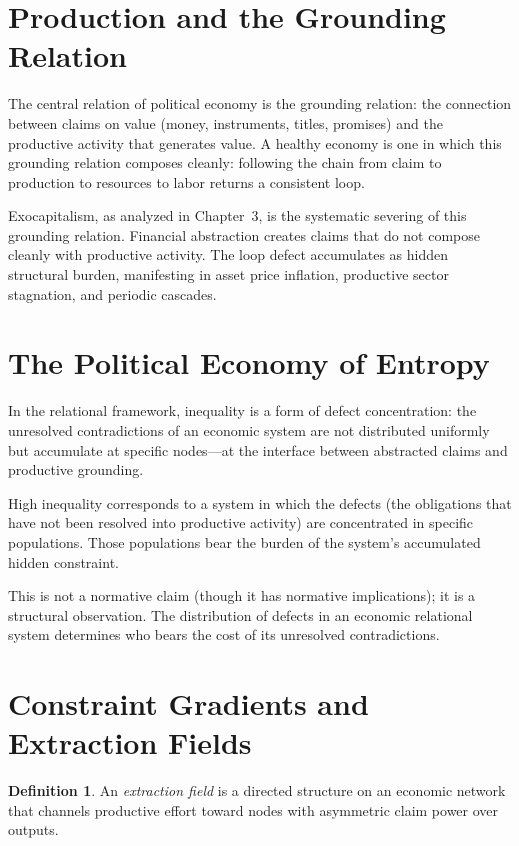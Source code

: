 \documentclass[12pt,a4paper,openany]{book}
\theoremstyle{plain}
\theoremstyle{definition}
\newtheorem{definition}[theorem]{Definition}
\theoremstyle{remark}
\begin{document}
\section{Production and the Grounding Relation}

The central relation of political economy is the grounding relation: the connection between claims on value (money, instruments, titles, promises) and the productive activity that generates value. A healthy economy is one in which this grounding relation composes cleanly: following the chain from claim to production to resources to labor returns a consistent loop.

Exocapitalism, as analyzed in Chapter~3, is the systematic severing of this grounding relation. Financial abstraction creates claims that do not compose cleanly with productive activity. The loop defect accumulates as hidden structural burden, manifesting in asset price inflation, productive sector stagnation, and periodic cascades.

\section{The Political Economy of Entropy}

In the relational framework, inequality is a form of defect concentration: the unresolved contradictions of an economic system are not distributed uniformly but accumulate at specific nodes---at the interface between abstracted claims and productive grounding.

High inequality corresponds to a system in which the defects (the obligations that have not been resolved into productive activity) are concentrated in specific populations. Those populations bear the burden of the system's accumulated hidden constraint.

This is not a normative claim (though it has normative implications); it is a structural observation. The distribution of defects in an economic relational system determines who bears the cost of its unresolved contradictions.


\section{Constraint Gradients and Extraction Fields}
\label{sec:constraint_gradients}

\begin{definition}
An \emph{extraction field} is a directed structure on an economic network that channels productive effort toward nodes with asymmetric claim power over outputs.
\end{definition}
\end{document}
